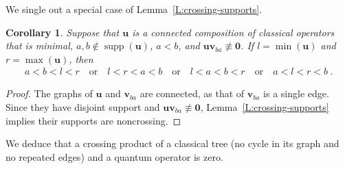 \documentclass[12pt,oneside,reqno]{amsart}
\newtheorem{corollary}[theorem]{Corollary}
\theoremstyle{definition}
\numberwithin{equation}{section}
\newcommand{\qu}{{\mathbf u}}
\newcommand{\qv}{{\mathbf v}}
\newcommand{\bzero}{{\mathbf 0}}
\DeclareMathOperator{\supp}{supp}
\begin{document}
We single out a special case of Lemma~\ref{L:crossing-supports}.

\begin{corollary}
    \label{corollary-classical-product-times-quantum}
    Suppose that $\qu$ is a connected composition of classical operators that is minimal,
    $a, b \notin \supp(\qu)$, $a<b$, and $\qu \qv_{ba} \not\equiv \bzero$.
    If $l = \min(\qu)$ and $r = \max(\qu)$, then
    \begin{gather*}
        a < b < l < r
        \quad\text{or}\quad
        l < r < a < b
        \quad\text{or}\quad
        l < a < b < r
        \quad\text{or}\quad
        a < l < r < b\ .
    \end{gather*}
\end{corollary}
\begin{proof}
    The graphs of $\qu$ and $\qv_{ba}$ are connected, as that of $\qv_{ba}$ is a single edge.
    Since they have disjoint support and $\qu \qv_{ba} \not\equiv \bzero$, Lemma~\ref{L:crossing-supports}
    implies their supports are noncrossing.
\end{proof}

We deduce that a crossing product of a classical tree (no cycle in its graph and no repeated edges) and
a quantum operator is zero.
\end{document}

